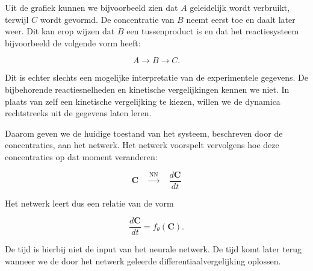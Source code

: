 \documentclass{ximera}
\begin{document}
\begin{question}
\begin{feedback}
Uit de grafiek kunnen we bijvoorbeeld zien dat $A$ geleidelijk wordt verbruikt, terwijl $C$ wordt gevormd. De concentratie van $B$ neemt eerst
toe en daalt later weer. Dit kan erop wijzen dat $B$ een tussenproduct is en dat het reactiesysteem bijvoorbeeld de volgende vorm heeft:

\[
A \longrightarrow B \longrightarrow C.
\]


Dit is echter slechts een mogelijke interpretatie van de experimentele gegevens. De bijbehorende reactiesnelheden en kinetische vergelijkingen
kennen we niet. In plaats van zelf een kinetische vergelijking te kiezen, willen we de dynamica rechtstreeks uit de gegevens laten leren.

Daarom geven we de huidige toestand van het systeem, beschreven door de concentraties, aan het netwerk. Het netwerk voorspelt vervolgens hoe deze
concentraties op dat moment veranderen:

\[
\boxed{
\mathbf C
\quad\xrightarrow{\text{NN}}\quad
\frac{d\mathbf C}{dt}
}
\]

Het netwerk leert dus een relatie van de vorm

\[
\frac{d\mathbf C}{dt}=f_\theta(\mathbf C).
\]

De tijd is hierbij niet de input van het neurale netwerk. De tijd komt later terug wanneer we de door  het netwerk geleerde differentiaalvergelijking oplossen.

\end{feedback}
\end{question}
\end{document}
